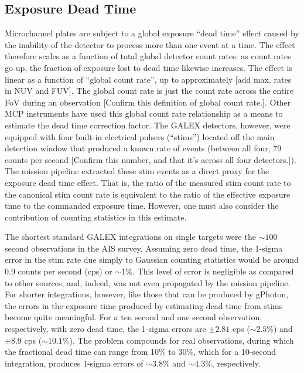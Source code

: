\documentclass[5p]{elsarticle}
\begin{document}
\subsection{Exposure Dead Time}
\label{deadtimedesc}
Microchannel plates are subject to a global exposure ``dead time'' effect caused by the inability of the detector to process more than one event at a time. The effect therefore scales as a function of total global detector count rates: as count rates go up, the fraction of exposure lost to dead time likewise increases. The effect is linear as a function of ``global count rate'', up to approximately {\color{red}[add max. rates in NUV and FUV]}.  The global count rate is just the count rate across the entire FoV during an observation {\color{red} [Confirm this definition of global count rate.]}. Other MCP instruments have used this global count rate relationship as a means to estimate the dead time correction factor. The GALEX detectors, however, were equipped with four built-in electrical pulsers (``stims'') located off the main detection window that produced a known rate of events (between all four, 79 counts per second {\color{red}[Confirm this number, and that it's across all four detectors.]}). The mission pipeline extracted these stim events as a direct proxy for the exposure dead time effect. That is, the ratio of the measured stim count rate to the canonical stim count rate is equivalent to the ratio of the effective exposure time to the commanded exposure time. However, one must also consider the contribution of counting statistics in this estimate.

The shortest standard GALEX integrations on single targets were the $\sim 100$ second observations in the AIS survey. Assuming zero dead time, the 1-sigma error in the stim rate due simply to Gaussian counting statistics would be around 0.9 counts per second (cps) or $\sim 1$\%. This level of error is negligible as compared to other sources, and, indeed, was not even propagated by the mission pipeline. For shorter integrations, however, like those that can be produced by gPhoton, the errors in the exposure time produced by estimating dead time from stims become quite meaningful. For a ten second and one second observation, respectively, with zero dead time, the 1-sigma errors are $\pm 2.81$ cps ($\sim 2.5$\%) and $\pm 8.9$ cps ($\sim 10.1$\%). The problem compounds for real observations, during which the fractional dead time can range from 10\% to 30\%, which for a 10-second integration, produces 1-sigma errors of $\sim 3.8$\% and $\sim 4.3$\%, respectively.
\end{document}
